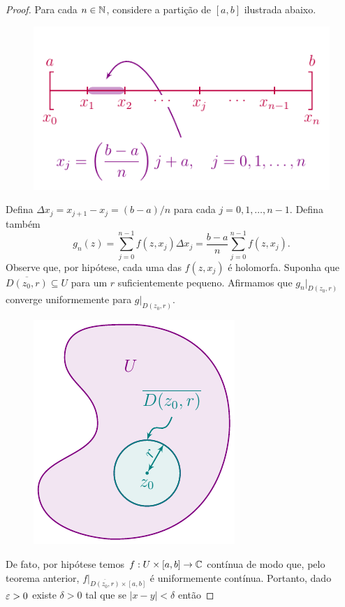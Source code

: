 \begin{proof}
Para cada $n\in\mathbb{N}$, considere a partição de $[a,b]$ ilustrada abaixo.
%
\begin{figure}[H]\centering
    \includegraphics{Figuras/partição integral.pdf}
\end{figure}
%
Defina $\Delta x_j = x_{j+1} - x_j = (b-a)/n$ para cada $j = 0, 1, \dots, n-1$.
Defina também
%
\[
g_n(z) = \sum_{j=0}^{n-1} f(z, x_j)\Delta x_j = \frac{b-a}{n}\sum_{j=0}^{n-1} f(z, x_j).
\]
%
Observe que, por hipótese, cada uma das $f(z, x_j)$ é holomorfa. Suponha que 
$\overline{D(z_0,r)} \subseteq U$ para um $r$ suficientemente pequeno. Afirmamos que
$g_n\big|_{D(z_0, r)}$ converge uniformemente para $g\big|_{D(z_0, r)}$.
%
\begin{figure}[H]\centering
    \includegraphics{Figuras/bola em U.pdf}
\end{figure}
%
De fato, por hipótese temos $f:U\times[a,b]\to\mathbb{C}$ contínua de modo que, pelo teorema anterior,
$f\big|_{\overline{D(z_0, r)} \times [a,b]}$ é uniformemente contínua. Portanto, dado $\varepsilon>0$
existe $\delta > 0$ tal que se $|x - y| < \delta$ então

\end{proof}
